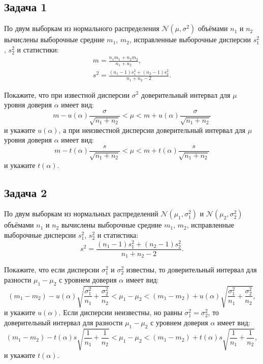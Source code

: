\documentclass[a4paper,12pt]{article}
\begin{document}
\subsection*{Задача 1 \cite[164]{Efimov}}

По двум выборкам из нормального распределения $\mathcal{N} \left( \mu, \sigma^2 \right)$ объёмами $n_1$ и $n_2$ вычислены выборочные средние
$m_1$, $m_2$, исправленные выборочные дисперсии $s_1^2$, $s_2^2$ и статистики:
\begin{gather*}
    m = \frac{n_1 m_1 + n_2 m_2}{n_1 + n_2} , \\
    s^2 = \frac{(n_1 - 1) s_1^2 + (n_2 - 1) s_2^2}{n_1 + n_2 - 2} .
\end{gather*}

Покажите, что при известной дисперсии $\sigma^2$ доверительный интервал для $\mu$ уровня доверия $\alpha$ имеет вид:
\[
    m - u(\alpha) \frac{\sigma}{\sqrt{n_1 + n_2}}
    < \mu
    < m + u(\alpha) \frac{\sigma}{\sqrt{n_1 + n_2}}
\]
и укажите $u(\alpha)$, а при неизвестной дисперсии доверительный интервал для $\mu$ уровня доверия $\alpha$ имеет вид:
\[
    m - t(\alpha) \frac{s}{\sqrt{n_1 + n_2}}
    < \mu
    < m + t(\alpha) \frac{s}{\sqrt{n_1 + n_2}}
\]
и укажите $t(\alpha)$.

\subsection*{Задача 2 \cite[176, 177]{Efimov}}

По двум выборкам из нормальных распределений $\mathcal{N} \left( \mu_1, \sigma_1^2 \right)$ и $\mathcal{N} \left( \mu_2, \sigma_2^2 \right)$ объёмами
$n_1$ и $n_2$ вычислены выборочные средние $m_1$, $m_2$, исправленные выборочные дисперсии $s_1^2$, $s_2^2$ и статистика:
\[
    s^2 = \frac{(n_1 - 1) s_1^2 + (n_2 - 1) s_2^2}{n_1 + n_2 - 2} .
\]

Покажите, что если дисперсии $\sigma_1^2$ и $\sigma_2^2$ известны, то доверительный интервал
для разности $\mu_1 - \mu_2$ с уровнем доверия $\alpha$ имеет вид:
\[
    (m_1 - m_2) - u(\alpha) \sqrt{\frac{\sigma_1^2}{n_1} + \frac{\sigma_2^2}{n_2}}
    < \mu_1 - \mu_2
    < (m_1 - m_2) + u(\alpha) \sqrt{\frac{\sigma_1^2}{n_1} + \frac{\sigma_2^2}{n_2}} ,
\]
и укажите $u(\alpha)$. Если дисперсии неизвестны, но равны $\sigma_1^2 = \sigma_2^2$, то доверительный интервал для разности $\mu_1 - \mu_2$
с уровнем доверия $\alpha$ имеет вид:
\[
    (m_1 - m_2) - t(\alpha) s \sqrt{\frac{1}{n_1} + \frac{1}{n_2}}
    < \mu_1 - \mu_2
    < (m_1 - m_2) + t(\alpha) s \sqrt{\frac{1}{n_1} + \frac{1}{n_2}} ,
\]
и укажите $t(\alpha)$.
\end{document}
